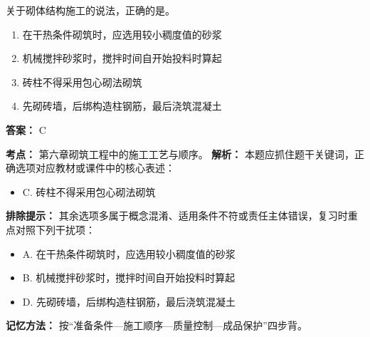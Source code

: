 \documentclass[UTF8,fontset=fandol,11pt]{ctexart}
\begin{document}
\begin{quizbox}[title={第 30 题}]
关于砌体结构施工的说法，正确的是。\\
\begin{enumerate}[label=\Alph*.]
\item 在干热条件砌筑时，应选用较小稠度值的砂浆
\item 机械搅拌砂浆时，搅拌时间自开始投料时算起
\item 砖柱不得采用包心砌法砌筑
\item 先砌砖墙，后绑构造柱钢筋，最后浇筑混凝土
\end{enumerate}
\textbf{答案：} C
\vspace{0.25em}
\begin{answerbox}[title={考点解析}]
\textbf{考点：} 第六章砌筑工程中的施工工艺与顺序。
\textbf{解析：} 本题应抓住题干关键词，正确选项对应教材或课件中的核心表述：
\begin{itemize}
\item C. 砖柱不得采用包心砌法砌筑
\end{itemize}
\textbf{排除提示：} 其余选项多属于概念混淆、适用条件不符或责任主体错误，复习时重点对照下列干扰项：
\begin{itemize}
\item A. 在干热条件砌筑时，应选用较小稠度值的砂浆
\item B. 机械搅拌砂浆时，搅拌时间自开始投料时算起
\item D. 先砌砖墙，后绑构造柱钢筋，最后浇筑混凝土
\end{itemize}
\textbf{记忆方法：} 按“准备条件—施工顺序—质量控制—成品保护”四步背。
\end{answerbox}
\end{quizbox}

\vspace{0.2em}
\end{document}
